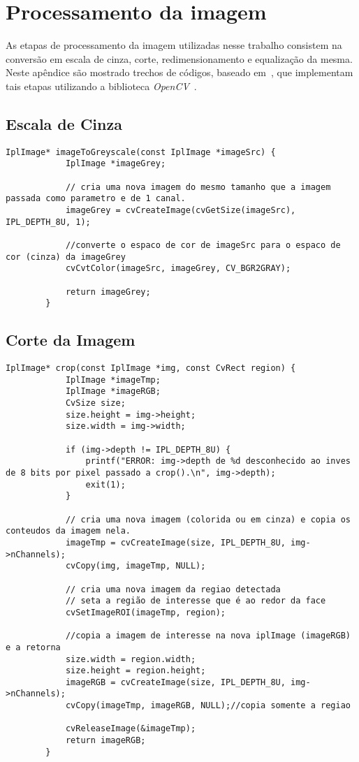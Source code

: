 \chapter{Processamento da imagem}
\label{apend:processamento}

As etapas de processamento da imagem utilizadas nesse trabalho consistem na conversão em escala de cinza, corte, redimensionamento e equalização da mesma. Neste apêndice são mostrado trechos de códigos, baseado em~\cite{shervin}, que implementam tais etapas utilizando a biblioteca \textit{OpenCV}~\cite{opencv_library}.

\section{Escala de Cinza}

		\begin{lstlisting}[caption=Conversão de uma imagem para escala de cinza., label=list:grey-scale]
		IplImage* imageToGreyscale(const IplImage *imageSrc) {
			IplImage *imageGrey;

			// cria uma nova imagem do mesmo tamanho que a imagem passada como parametro e de 1 canal.
			imageGrey = cvCreateImage(cvGetSize(imageSrc), IPL_DEPTH_8U, 1);

			//converte o espaco de cor de imageSrc para o espaco de cor (cinza) da imageGrey
			cvCvtColor(imageSrc, imageGrey, CV_BGR2GRAY);

			return imageGrey;
		}
		\end{lstlisting}

\section{Corte da Imagem}

	\begin{lstlisting}[caption=Corte de uma imagem., label=list:crop]
		IplImage* crop(const IplImage *img, const CvRect region) {
			IplImage *imageTmp;
			IplImage *imageRGB;
			CvSize size;
			size.height = img->height;
			size.width = img->width;

			if (img->depth != IPL_DEPTH_8U) {
				printf("ERROR: img->depth de %d desconhecido ao inves de 8 bits por pixel passado a crop().\n", img->depth);
				exit(1);
			}

			// cria uma nova imagem (colorida ou em cinza) e copia os conteudos da imagem nela.
			imageTmp = cvCreateImage(size, IPL_DEPTH_8U, img->nChannels);
			cvCopy(img, imageTmp, NULL);

			// cria uma nova imagem da regiao detectada
			// seta a região de interesse que é ao redor da face
			cvSetImageROI(imageTmp, region);

			//copia a imagem de interesse na nova iplImage (imageRGB) e a retorna
			size.width = region.width;
			size.height = region.height;
			imageRGB = cvCreateImage(size, IPL_DEPTH_8U, img->nChannels);
			cvCopy(imageTmp, imageRGB, NULL);//copia somente a regiao

			cvReleaseImage(&imageTmp);
			return imageRGB;
		}
	\end{lstlisting}

